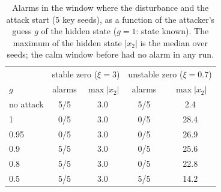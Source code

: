\begin{table}[t]
\centering
\caption{Alarms in the window where the disturbance and the attack start (5 key seeds), as a function of the attacker's guess $g$ of the hidden state ($g=1$: state known). The maximum of the hidden state $|x_2|$ is the median over seeds; the calm window before had no alarm in any run.}
\label{tab:stealth}
\small
\begin{tabular}{lcccc}
\toprule
 & \multicolumn{2}{c}{stable zero ($\xi=3$)} & \multicolumn{2}{c}{unstable zero ($\xi=0.7$)} \\
$g$ & alarms & $\max|x_2|$ & alarms & $\max|x_2|$ \\
\midrule
no attack & 5/5 & 3.0 & 5/5 & 2.4 \\
1 & 0/5 & 3.0 & 0/5 & 28.4 \\
0.95 & 0/5 & 3.0 & 0/5 & 26.9 \\
0.9 & 5/5 & 3.0 & 0/5 & 25.6 \\
0.8 & 5/5 & 3.0 & 0/5 & 22.8 \\
0.5 & 5/5 & 3.0 & 5/5 & 14.2 \\
\bottomrule
\end{tabular}
\end{table}
